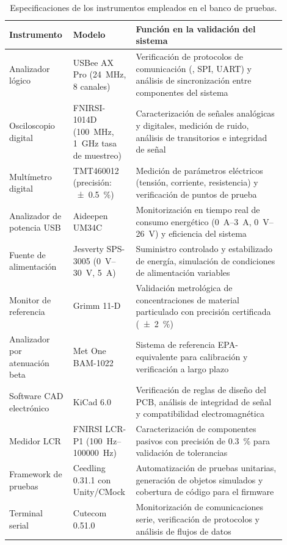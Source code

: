 \begin{table}[!hbp]
	\centering
	\small
	\caption{Especificaciones de los instrumentos empleados en el banco de pruebas.}
	\label{tab:pruebas2}
	\begin{tabular}{p{0.20\linewidth}p{0.18\linewidth}p{0.52\linewidth}}
		\toprule
		\textbf{Instrumento} & \textbf{Modelo} & \textbf{Función en la validación del sistema} \\
		\bottomrule
		Analizador lógico & USBee AX Pro (\SI{24}{\mega\hertz}, 8 canales) & Verificación de protocolos de comunicación (\IIC, SPI, UART) y análisis de sincronización entre componentes del sistema \\
		
		Osciloscopio digital & FNIRSI-1014D (\SI{100}{\mega\hertz}, \SI{1}{\giga\hertz} tasa de muestreo) & Caracterización de señales analógicas y digitales, medición de ruido, análisis de transitorios e integridad de señal \\
		
		Multímetro digital & TMT460012 (precisión: \SI{\pm0.5}{\percent}) & Medición de parámetros eléctricos (tensión, corriente, resistencia) y verificación de puntos de prueba \\
		
		Analizador de potencia USB & Aideepen UM34C & Monitorización en tiempo real de consumo energético (\SI{0}{\ampere}--\SI{3}{\ampere}, \SI{0}{\volt}--\SI{26}{\volt}) y eficiencia del sistema \\
		
		Fuente de alimentación & Jesverty SPS-3005 (\SIrange{0}{30}{\volt}, \SI{5}{\ampere}) & Suministro controlado y estabilizado de energía, simulación de condiciones de alimentación variables \\
		
		Monitor de referencia \MPF & Grimm 11-D & Validación metrológica de concentraciones de material particulado con precisión certificada (\SI{\pm2}{\percent}) \\
		
		Analizador por atenuación beta & Met One BAM-1022 & Sistema de referencia EPA-equivalente para calibración y verificación a largo plazo \\
		
		Software CAD electrónico & KiCad 6.0 & Verificación de reglas de diseño del PCB, análisis de integridad de señal y compatibilidad electromagnética \\
		
		Medidor LCR & FNIRSI LCR-P1 (\SIrange{100}{100000}{\hertz}) & Caracterización de componentes pasivos con precisión de \SI{0.3}{\percent} para validación de tolerancias \\
		
		Framework de pruebas & Ceedling 0.31.1 con Unity/CMock & Automatización de pruebas unitarias, generación de objetos simulados y cobertura de código para el firmware \\
		
		Terminal serial & Cutecom 0.51.0 & Monitorización de comunicaciones serie, verificación de protocolos y análisis de flujos de datos \\
		\bottomrule
	\end{tabular}
\end{table}



